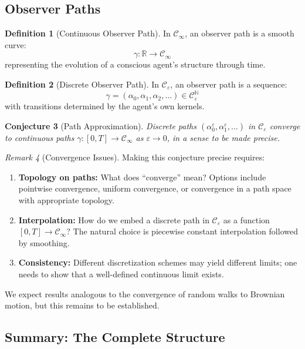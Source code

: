 \documentclass[11pt,a4paper]{article}
\theoremstyle{definition}
\newtheorem{definition}{Definition}[section]
\theoremstyle{plain}
\newtheorem{conjecture}[definition]{Conjecture}
\theoremstyle{remark}
\newtheorem{remark}[definition]{Remark}
\begin{document}
\subsection{Observer Paths}

\begin{definition}[Continuous Observer Path]
In $\mathcal{C}_\infty$, an observer path is a smooth curve:
\[
\gamma: \mathbb{R} \to \mathcal{C}_\infty
\]
representing the evolution of a conscious agent's structure through time.
\end{definition}

\begin{definition}[Discrete Observer Path]
In $\mathcal{C}_\varepsilon$, an observer path is a sequence:
\[
\gamma = (\alpha_0, \alpha_1, \alpha_2, \ldots) \in \mathcal{C}_\varepsilon^{\mathbb{N}}
\]
with transitions determined by the agent's own kernels.
\end{definition}

\begin{conjecture}[Path Approximation]
Discrete paths $(\alpha_0^\varepsilon, \alpha_1^\varepsilon, \ldots)$ in $\mathcal{C}_\varepsilon$ converge to continuous paths $\gamma: [0, T] \to \mathcal{C}_\infty$ as $\varepsilon \to 0$, in a sense to be made precise.
\end{conjecture}

\begin{remark}[Convergence Issues]
Making this conjecture precise requires:
\begin{enumerate}[label=(\roman*)]
    \item \textbf{Topology on paths:} What does ``converge'' mean? Options include pointwise convergence, uniform convergence, or convergence in a path space with appropriate topology.
    \item \textbf{Interpolation:} How do we embed a discrete path in $\mathcal{C}_\varepsilon$ as a function $[0, T] \to \mathcal{C}_\infty$? The natural choice is piecewise constant interpolation followed by smoothing.
    \item \textbf{Consistency:} Different discretization schemes may yield different limits; one needs to show that a well-defined continuous limit exists.
\end{enumerate}
We expect results analogous to the convergence of random walks to Brownian motion, but this remains to be established.
\end{remark}

\subsection{Summary: The Complete Structure}
\end{document}
